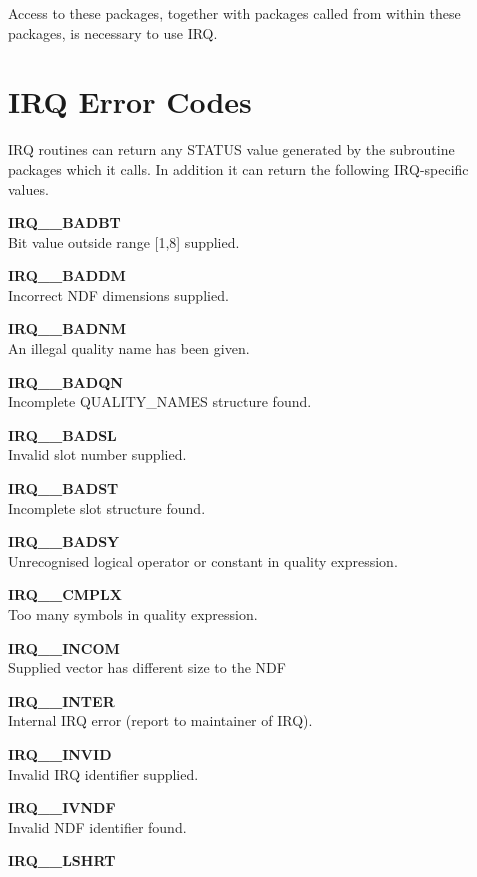 \documentclass[twoside,11pt,nolof]{starlink}
\begin{document}
Access to these packages, together with packages called from within these
packages, is necessary to use IRQ.

\newpage

\section {IRQ Error Codes}
\label {APP:ERRORS}

IRQ routines can return any STATUS value generated by the subroutine
packages which it calls. In addition it can return the following
IRQ-specific values.

\begin{description}
\item \textbf{IRQ\_\_BADBT}\\
Bit value outside range [1,8] supplied.
\item \textbf{IRQ\_\_BADDM}\\
Incorrect NDF dimensions supplied.
\item \textbf{IRQ\_\_BADNM}\\
An illegal quality name has been given.
\item \textbf{IRQ\_\_BADQN}\\
Incomplete QUALITY\_NAMES structure found.
\item \textbf{IRQ\_\_BADSL}\\
Invalid slot number supplied.
\item \textbf{IRQ\_\_BADST}\\
Incomplete slot structure found.
\item \textbf{IRQ\_\_BADSY}\\
Unrecognised logical operator or constant in quality expression.
\item \textbf{IRQ\_\_CMPLX}\\
Too many symbols in quality expression.
\item \textbf{IRQ\_\_INCOM}\\
Supplied vector has different size to the NDF
\item \textbf{IRQ\_\_INTER}\\
Internal IRQ error (report to maintainer of IRQ).
\item \textbf{IRQ\_\_INVID}\\
Invalid IRQ identifier supplied.
\item \textbf{IRQ\_\_IVNDF}\\
Invalid NDF identifier found.
\item \textbf{IRQ\_\_LSHRT}\\

\end{description}
\end{document}
